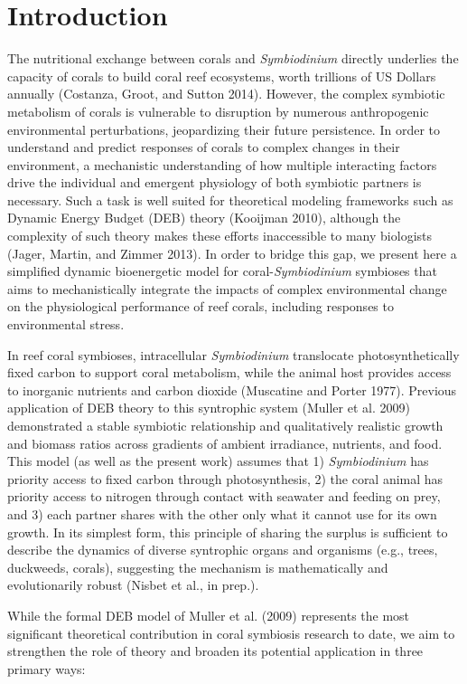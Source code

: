 \documentclass[]{elsarticle} %
\begin{document}
\section{Introduction}\label{introduction}

The nutritional exchange between corals and \emph{Symbiodinium} directly
underlies the capacity of corals to build coral reef ecosystems, worth
trillions of US Dollars annually (Costanza, Groot, and Sutton 2014).
However, the complex symbiotic metabolism of corals is vulnerable to
disruption by numerous anthropogenic environmental perturbations,
jeopardizing their future persistence. In order to understand and
predict responses of corals to complex changes in their environment, a
mechanistic understanding of how multiple interacting factors drive the
individual and emergent physiology of both symbiotic partners is
necessary. Such a task is well suited for theoretical modeling
frameworks such as Dynamic Energy Budget (DEB) theory (Kooijman 2010),
although the complexity of such theory makes these efforts inaccessible
to many biologists (Jager, Martin, and Zimmer 2013). In order to bridge
this gap, we present here a simplified dynamic bioenergetic model for
coral-\emph{Symbiodinium} symbioses that aims to mechanistically
integrate the impacts of complex environmental change on the
physiological performance of reef corals, including responses to
environmental stress.

In reef coral symbioses, intracellular \emph{Symbiodinium} translocate
photosynthetically fixed carbon to support coral metabolism, while the
animal host provides access to inorganic nutrients and carbon dioxide
(Muscatine and Porter 1977). Previous application of DEB theory to this
syntrophic system (Muller et al. 2009) demonstrated a stable symbiotic
relationship and qualitatively realistic growth and biomass ratios
across gradients of ambient irradiance, nutrients, and food. This model
(as well as the present work) assumes that 1) \emph{Symbiodinium} has
priority access to fixed carbon through photosynthesis, 2) the coral
animal has priority access to nitrogen through contact with seawater and
feeding on prey, and 3) each partner shares with the other only what it
cannot use for its own growth. In its simplest form, this principle of
sharing the surplus is sufficient to describe the dynamics of diverse
syntrophic organs and organisms (e.g., trees, duckweeds, corals),
suggesting the mechanism is mathematically and evolutionarily robust
(Nisbet et al., in prep.).

While the formal DEB model of Muller et al. (2009) represents the most
significant theoretical contribution in coral symbiosis research to
date, we aim to strengthen the role of theory and broaden its potential
application in three primary ways:
\end{document}
